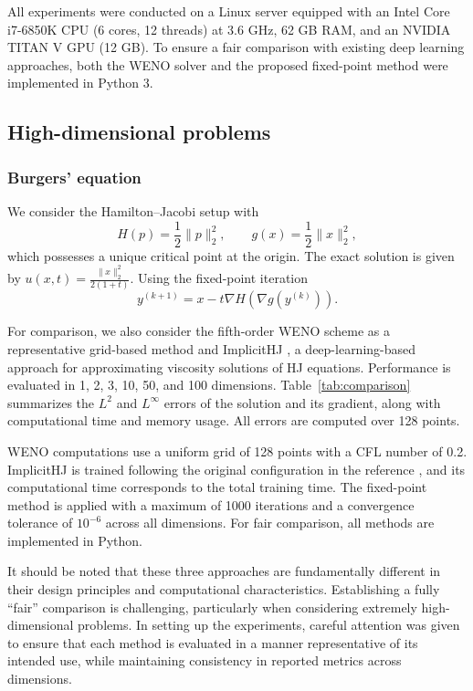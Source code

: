 \documentclass[review,hidelinks,onefignum,onetabnum]{siamart250106}
\begin{document}
All experiments were conducted on a Linux server equipped with an Intel Core i7-6850K CPU (6 cores, 12 threads) at 3.6 GHz, 62 GB RAM, and an NVIDIA TITAN V GPU (12 GB). 
To ensure a fair comparison with existing deep learning approaches, both the WENO solver and the proposed fixed-point method were implemented in Python 3.

\subsection{High-dimensional problems}
\subsubsection{Burgers' equation}
We consider the Hamilton--Jacobi setup with 
\begin{equation}
H(p) = \frac{1}{2} \|p\|_2^2, \qquad g(x) = \frac{1}{2} \|x\|_2^2,
\end{equation}
which possesses a unique critical point at the origin. The exact solution is given by $u(x,t)=\frac{ \|x\|_2^2}{2(1+t)}$. Using the fixed-point iteration 
\[
y^{(k+1)} = x - t \nabla H(\nabla g(y^{(k)})).
\]


For comparison, we also consider the fifth-order WENO scheme as a representative grid-based method and ImplicitHJ \cite{park2025implicit}, a deep-learning-based approach for approximating viscosity solutions of HJ equations. Performance is evaluated in 1, 2, 3, 10, 50, and 100 dimensions. Table~\ref{tab:comparison} summarizes the $L^2$ and $L^\infty$ errors of the solution and its gradient, along with computational time and memory usage. All errors are computed over 128  points.  

WENO computations use a uniform grid of 128 points with a CFL number of 0.2. ImplicitHJ is trained following the original configuration in the reference \cite{park2025implicit}, and its computational time corresponds to the total training time. The fixed-point method is applied with a maximum of 1000 iterations and a convergence tolerance of $10^{-6}$ across all dimensions. For fair comparison, all methods are implemented in Python.

It should be noted that these three approaches are fundamentally different in their design principles and computational characteristics. Establishing a fully “fair” comparison is challenging, particularly when considering extremely high-dimensional problems. In setting up the experiments, careful attention was given to ensure that each method is evaluated in a manner representative of its intended use, while maintaining consistency in reported metrics across dimensions.
\end{document}
